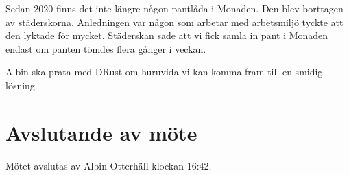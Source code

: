 \documentclass[protokoll]{dvd}
\begin{document}
Sedan 2020 finns det inte längre någon pantlåda i Monaden.
Den blev borttagen av städerskorna.
Anledningen var någon som arbetar med arbetsmiljö tyckte att den lyktade för mycket.
Städerskan sade att vi fick samla in pant i Monaden endast om panten tömdes flera gånger i veckan.

\begin{åtagande}
    \item Albin ska prata med DRust om huruvida vi kan komma fram till en smidig lösning.
\end{åtagande}

\section{Avslutande av möte}

Mötet avslutas av Albin Otterhäll klockan 16:42.

\styrelsesignaturer
\end{document}
